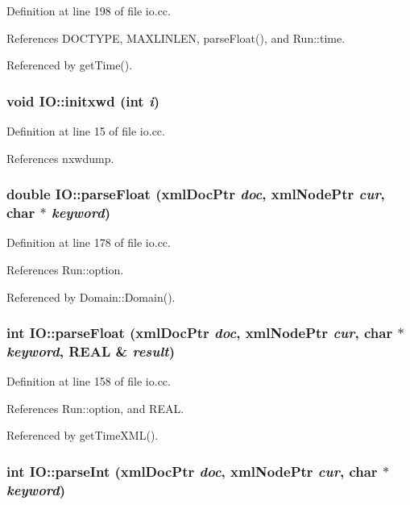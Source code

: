 Definition at line 198 of file io.cc.

References DOCTYPE, MAXLINLEN, parseFloat(), and Run::time.

Referenced by getTime().\hypertarget{namespaceIO_2b0843f1085e5877aa8a10051f3e4f2c}{
\subsubsection[{initxwd}]{\setlength{\rightskip}{0pt plus 5cm}void IO::initxwd (int {\em i})}}
\label{namespaceIO_2b0843f1085e5877aa8a10051f3e4f2c}




Definition at line 15 of file io.cc.

References nxwdump.\hypertarget{namespaceIO_0fce622fef6e4870e9a4ae547a5e759d}{
\subsubsection[{parseFloat}]{\setlength{\rightskip}{0pt plus 5cm}double IO::parseFloat (xmlDocPtr {\em doc}, \/  xmlNodePtr {\em cur}, \/  char $\ast$ {\em keyword})}}
\label{namespaceIO_0fce622fef6e4870e9a4ae547a5e759d}




Definition at line 178 of file io.cc.

References Run::option.

Referenced by Domain::Domain().\hypertarget{namespaceIO_d779767981775bbcac51a4a6cbd5ce60}{
\subsubsection[{parseFloat}]{\setlength{\rightskip}{0pt plus 5cm}int IO::parseFloat (xmlDocPtr {\em doc}, \/  xmlNodePtr {\em cur}, \/  char $\ast$ {\em keyword}, \/  REAL \& {\em result})}}
\label{namespaceIO_d779767981775bbcac51a4a6cbd5ce60}




Definition at line 158 of file io.cc.

References Run::option, and REAL.

Referenced by getTimeXML().\hypertarget{namespaceIO_d0eeab644b5eaf9455f04c84be01af30}{
\subsubsection[{parseInt}]{\setlength{\rightskip}{0pt plus 5cm}int IO::parseInt (xmlDocPtr {\em doc}, \/  xmlNodePtr {\em cur}, \/  char $\ast$ {\em keyword})}}
\label{namespaceIO_d0eeab644b5eaf9455f04c84be01af30}




